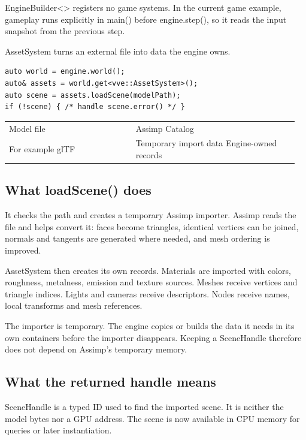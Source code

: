 \documentclass[11pt,a4paper]{article}
\begin{document}
EngineBuilder<> registers no game systems. In the current game example, gameplay runs explicitly in main() before engine.step(), so it reads the input snapshot from the previous step.

\label{core-29}
AssetSystem turns an external file into data the engine owns.

\begin{lstlisting}[language={}]
auto world = engine.world();
auto& assets = world.get<vve::AssetSystem>();
auto scene = assets.loadScene(modelPath);
if (!scene) { /* handle scene.error() */ }
\end{lstlisting}

{\small
\begin{longtable}{@{}p{0.42\linewidth}p{0.54\linewidth}@{}}
Model file & Assimp                                Catalog \\
For example glTF & Temporary import data                Engine-owned records \\
\end{longtable}
}

\subsection*{What loadScene() does}
It checks the path and creates a temporary Assimp importer. Assimp reads the file and helps convert it: faces become triangles, identical vertices can be joined, normals and tangents are generated where needed, and mesh ordering is improved.

AssetSystem then creates its own records. Materials are imported with colors, roughness, metalness, emission and texture sources. Meshes receive vertices and triangle indices. Lights and cameras receive descriptors. Nodes receive names, local transforms and mesh references.

The importer is temporary. The engine copies or builds the data it needs in its own containers before the importer disappears. Keeping a SceneHandle therefore does not depend on Assimp's temporary memory.

\subsection*{What the returned handle means}
SceneHandle is a typed ID used to find the imported scene. It is neither the model bytes nor a GPU address. The scene is now available in CPU memory for queries or later instantiation.
\end{document}
